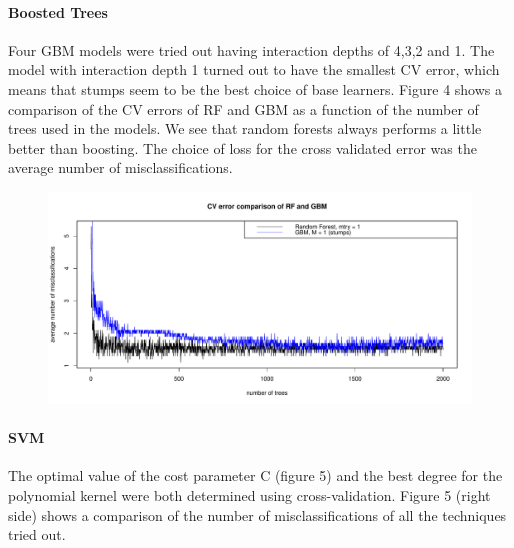 \documentclass{article}
\begin{document}
\paragraph{Boosted Trees} 

Four GBM models were tried out having interaction depths of 4,3,2 and 1. The model with interaction depth 1 turned out to have the smallest CV error, which means that stumps seem to be the best choice of base learners. Figure 4 shows a comparison of the CV errors of RF and GBM as a function of the number of trees used in the models. We see that random forests always performs a little better than boosting. The choice of loss for the cross validated error was the average number of misclassifications.

\begin{figure}[h]				%
	\centering
	\includegraphics[width=16cm]{DA2/Plots/RF_GBM_CVerr_Comparison.pdf}
	\caption{}
\end{figure}

\paragraph{SVM}

The optimal value of the cost parameter C (figure 5) and the best degree for the polynomial kernel were both determined using cross-validation. Figure 5 (right side) shows a comparison of the number of misclassifications of all the techniques tried out.
\end{document}
